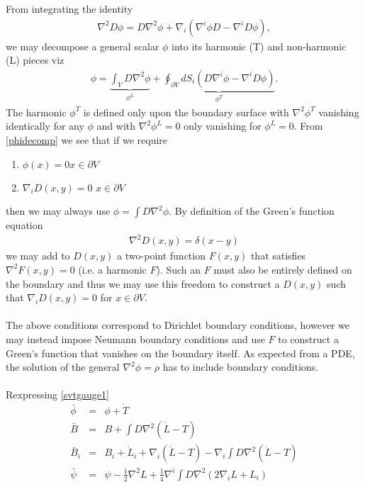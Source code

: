 \documentclass[10pt,letterpaper]{article}
\numberwithin{equation}{section}
\begin{document}
\begin{appendices}
From integrating the identity
\begin{eqnarray}
\nabla^2 D \phi = D\nabla^2 \phi + \nabla_i \left( \nabla^i \phi D - \nabla^i D \phi\right),
\end{eqnarray}
we may decompose a general scalar $\phi$ into its harmonic (T) and non-harmonic (L) pieces viz
\begin{eqnarray}
\phi =\underbrace{\int_V D \nabla^2 \phi}_{\phi^L} + \underbrace{\oint_{\partial V} dS_i \left( D \nabla^i \phi - \nabla^i D \phi\right)}_{\phi^T}.
\label{phidecomp}
\end{eqnarray}
The harmonic $\phi^T$ is defined only upon the boundary surface with $\nabla^2 \phi^T$ vanishing identically for any $\phi$ and with $\nabla^2 \phi^L=0$ only vanishing for $\phi^L=0$. 
From \eqref{phidecomp} we see that if we require
\begin{enumerate}
\item $\phi(x) =0 $\quad{}\quad $x\in \partial V$
\item $\nabla_i D(x,y)= 0$ \quad{}\quad $x\in \partial V$
\end{enumerate}
then we may always use $\phi = \int D\nabla^2 \phi$. By definition of the Green's function equation
\begin{eqnarray}
\nabla^2 D(x,y) = \delta(x-y)
\end{eqnarray}
we may add to $D(x,y)$ a two-point function $F(x,y)$ that satisfies $\nabla^2 F(x,y) = 0$ (i.e. a harmonic $F$). Such an $F$ must also be entirely defined on the boundary and thus we may use this freedom to construct a $D(x,y)$ such that $\nabla_i D(x,y)=0$ for $x\in \partial V$. 
\\ \\
The above conditions correspond to Dirichlet boundary conditions, however we may instead impose Neumann boundary conditions and use $F$ to construct a Green's function that vanishes on the boundary itself. As expected from a PDE, the solution of the general $\nabla^2 \phi = \rho$ has to include boundary conditions.
\\ \\
Rexpressing \eqref{svtgauge1}
\begin{eqnarray}
\bar\phi &=& \phi+ \dot T
\nonumber\\
\bar B &=& B + \int D \nabla^2(\dot L-T)
\nonumber\\
\bar B_i &=& B_i + \dot L_i + \nabla_i (\dot L-T) - \nabla_i \int D \nabla^2(\dot L-T)
\nonumber\\
\bar\psi&=& \psi -\tfrac12 \nabla^2 L+\tfrac14 \nabla^i \int D \nabla^2 (2\nabla_i L + L_i)

\end{eqnarray}
\end{appendices}
\end{document}
